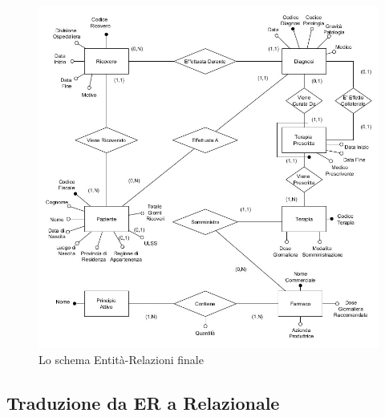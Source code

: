 \documentclass{article}
\begin{document}
\begin{figure}[!ht] %
    \centering
    \includegraphics[width=\linewidth]{schema4}
    \caption{Lo schema Entità-Relazioni finale}
    \label{fig:ER_finale}
\end{figure}

\subsection{Traduzione da ER a Relazionale}
\end{document}

